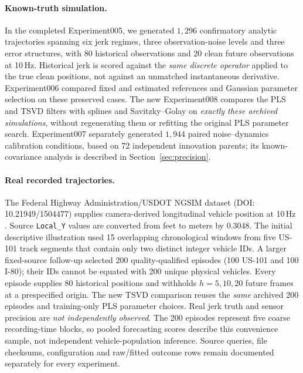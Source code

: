 \paragraph{Known-truth simulation.}
In the completed Experiment005, we generated $1{,}296$
confirmatory analytic trajectories spanning six jerk
regimes, three observation-noise levels and three error
structures, with 80 historical observations and 20
clean future observations at 10\,Hz. Historical jerk
is scored against the \emph{same discrete operator}
applied to the true clean positions, not against an
unmatched instantaneous derivative. Experiment006
compared fixed and estimated references and Gaussian
parameter selection on these preserved cases. The
new Experiment008 compares the PLS and TSVD filters
with splines and Savitzky--Golay on \emph{exactly
these archived simulations}, without regenerating
them or refitting the original PLS parameter search.
Experiment007 separately generated $1{,}944$ paired
noise--dynamics calibration conditions, based on
72 independent innovation parents; its known-covariance
analysis is described in Section~\ref{sec:precision}.

\paragraph{Real recorded trajectories.}
The Federal Highway Administration/USDOT NGSIM
dataset (DOI: 10.21949/1504477) supplies camera-derived
longitudinal vehicle position at 10\,Hz
\citep{fhwa2016}. Source \texttt{Local\_Y} values
are converted from feet to meters by $0.3048$.
The initial descriptive illustration used 15 overlapping
chronological windows from five US-101 track segments
that contain only two distinct integer vehicle IDs.
A larger fixed-source follow-up selected 200 quality-qualified
episodes (100 US-101 and 100 I-80); their IDs
cannot be equated with 200 unique physical vehicles.
Every episode supplies 80 historical positions and
withholds $h=5,10,20$ future frames at a prespecified
origin. The new TSVD comparison reuses the
\emph{same} archived 200 episodes and training-only
PLS parameter choices. Real jerk truth and sensor
precision are \emph{not independently observed}.
The 200 episodes represent five coarse recording-time
blocks, so pooled forecasting scores describe this
convenience sample, not independent vehicle-population
inference. Source queries, file checksums, configuration
and raw/fitted outcome rows remain documented separately
for every experiment.
